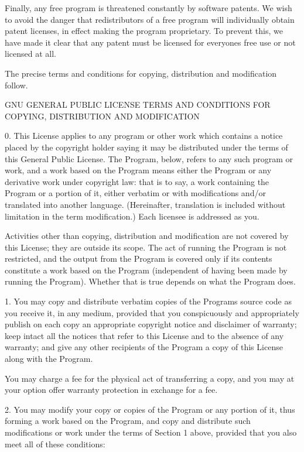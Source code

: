 \documentclass[letterpaper,10pt,english]{sphinxmanual}
\begin{document}
\begin{sphinxVerbatim}[commandchars=\\\{\}]
  Finally, any free program is threatened constantly by software
patents.  We wish to avoid the danger that redistributors of a free
program will individually obtain patent licenses, in effect making the
program proprietary.  To prevent this, we have made it clear that any
patent must be licensed for everyone\PYGZsq{}s free use or not licensed at all.

  The precise terms and conditions for copying, distribution and
modification follow.

                    GNU GENERAL PUBLIC LICENSE
   TERMS AND CONDITIONS FOR COPYING, DISTRIBUTION AND MODIFICATION

  0. This License applies to any program or other work which contains
a notice placed by the copyright holder saying it may be distributed
under the terms of this General Public License.  The \PYGZdq{}Program\PYGZdq{}, below,
refers to any such program or work, and a \PYGZdq{}work based on the Program\PYGZdq{}
means either the Program or any derivative work under copyright law:
that is to say, a work containing the Program or a portion of it,
either verbatim or with modifications and/or translated into another
language.  (Hereinafter, translation is included without limitation in
the term \PYGZdq{}modification\PYGZdq{}.)  Each licensee is addressed as \PYGZdq{}you\PYGZdq{}.

Activities other than copying, distribution and modification are not
covered by this License; they are outside its scope.  The act of
running the Program is not restricted, and the output from the Program
is covered only if its contents constitute a work based on the
Program (independent of having been made by running the Program).
Whether that is true depends on what the Program does.

  1. You may copy and distribute verbatim copies of the Program\PYGZsq{}s
source code as you receive it, in any medium, provided that you
conspicuously and appropriately publish on each copy an appropriate
copyright notice and disclaimer of warranty; keep intact all the
notices that refer to this License and to the absence of any warranty;
and give any other recipients of the Program a copy of this License
along with the Program.

You may charge a fee for the physical act of transferring a copy, and
you may at your option offer warranty protection in exchange for a fee.

  2. You may modify your copy or copies of the Program or any portion
of it, thus forming a work based on the Program, and copy and
distribute such modifications or work under the terms of Section 1
above, provided that you also meet all of these conditions:


\end{sphinxVerbatim}
\end{document}
